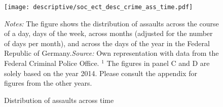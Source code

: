 \begin{figure}[ht]\centering
	\caption{Distribution of assaults across time}\label{fig_soc_ext:assault_time_distribution_2014}

	\texttt{[image: descriptive/soc\_ect\_desc\_crime\_ass\_time.pdf]}

	\begin{minipage}{\linewidth}
		\scriptsize{\emph{Notes:} The figure shows the distribution of assaults across the course of a day, days of the week, across months (adjusted for the number of days per month), and across the days of the year in the Federal Republic of Germany.\newline \emph{Source:} Own representation with data from the Federal Criminal Police Office.\newline \hspace{1 em} $^1$ The figures in panel C and D are solely based on the year 2014. Please consult the appendix for figures from the other years.}
	\end{minipage}
\end{figure}


%
